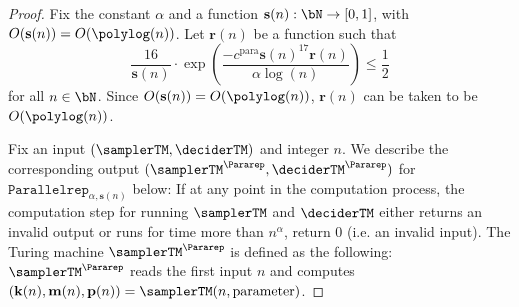 \begin{proof}
	Fix the constant $\alpha$ and a function $\mathbf{s}(n): \bN \rightarrow [0,1]$, with $O(\mathbf{s}(n)) = O(\polylog(n))$. Let $\mathbf{r}(n)$ be a function such that 
	\begin{equation} \label{eq:parallelrepparameter}
		 \frac{16}{\mathbf{s}(n)} \cdot \exp{\left(\frac{- c^{\text{para}} \mathbf{s}(n)^{17} \mathbf{r}(n) }{\alpha \log(n)}\right)} \leq \frac{1}{2}
	\end{equation}
	for all $n \in \bN$. Since $O(\mathbf{s}(n)) = O(\polylog(n))$, $\mathbf{r}(n)$ can be taken to be $ O(\polylog(n))$. 
	
	Fix an input $(\samplerTM, \deciderTM)$ and integer $n$. We describe the corresponding output $(\samplerTM^{\Pararep}, \deciderTM^{\Pararep})$ for $\texttt{Parallelrep}_{\alpha, \textbf{s}(n)}$ below: If at any point in the computation process, the computation step for running $\samplerTM$ and $\deciderTM$ either returns an invalid output or runs for time more than $n^{\alpha}$, return $0$ (i.e. an invalid input). The Turing machine $\samplerTM^{\Pararep}$ is defined as the following: $\samplerTM^{\Pararep}$ reads the first input $n$ and computes $(\mathbf{k}(n), \mathbf{m}(n) , \mathbf{p}(n)) = \samplerTM(n, \text{parameter})$. 
	

\end{proof}
